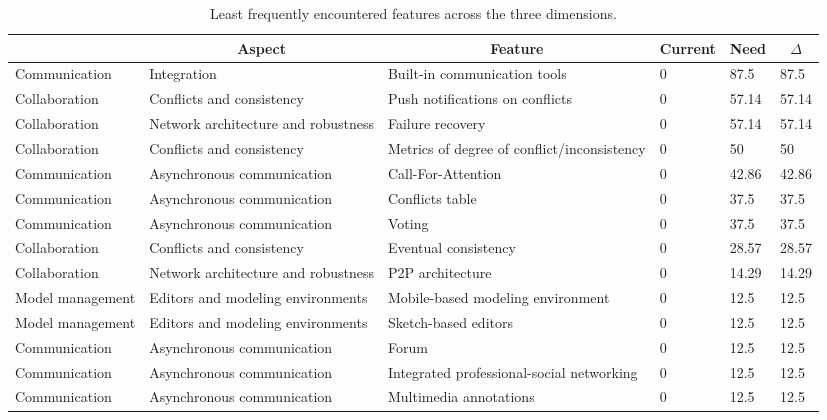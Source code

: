 
  \begin{table*}[]
  \centering
  \notsotiny
  \caption{ Least frequently encountered features across the three dimensions.}
\label{tab:least-frequent}
\begin{tabular}{|l|l|l|l|l|l|}
  \hline
  \rowcolor[HTML]{C0C0C0}
    \multicolumn{1}{|c|}{Dimension} & \multicolumn{1}{c|}{Aspect} & \multicolumn{1}{c|}{Feature} & \multicolumn{1}{c|}{Current} & \multicolumn{1}{c|}{Need} & \multicolumn{1}{c|}{$\Delta$} \\ \hline
    Communication & Integration & Built-in communication tools & 0 & 87.5 & 87.5 \\ \hline 
Collaboration & Conflicts and consistency & Push notifications on conflicts & 0 & 57.14 & 57.14 \\ \hline 
Collaboration & Network architecture and robustness & Failure recovery & 0 & 57.14 & 57.14 \\ \hline 
Collaboration & Conflicts and consistency & Metrics of degree of conflict/inconsistency & 0 & 50 & 50 \\ \hline 
Communication & Asynchronous communication & Call-For-Attention & 0 & 42.86 & 42.86 \\ \hline 
Communication & Asynchronous communication & Conflicts table & 0 & 37.5 & 37.5 \\ \hline 
Communication & Asynchronous communication & Voting & 0 & 37.5 & 37.5 \\ \hline 
Collaboration & Conflicts and consistency & Eventual consistency & 0 & 28.57 & 28.57 \\ \hline 
Collaboration & Network architecture and robustness & P2P architecture & 0 & 14.29 & 14.29 \\ \hline 
Model management & Editors and modeling environments & Mobile-based modeling environment & 0 & 12.5 & 12.5 \\ \hline 
Model management & Editors and modeling environments & Sketch-based editors & 0 & 12.5 & 12.5 \\ \hline 
Communication & Asynchronous communication & Forum & 0 & 12.5 & 12.5 \\ \hline 
Communication & Asynchronous communication & Integrated professional-social networking & 0 & 12.5 & 12.5 \\ \hline 
Communication & Asynchronous communication & Multimedia annotations & 0 & 12.5 & 12.5 \\ \hline 

\end{tabular}
\end{table*}
